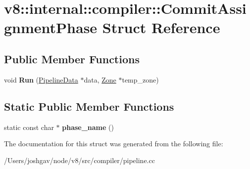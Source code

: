 \hypertarget{structv8_1_1internal_1_1compiler_1_1_commit_assignment_phase}{}\section{v8\+:\+:internal\+:\+:compiler\+:\+:Commit\+Assignment\+Phase Struct Reference}
\label{structv8_1_1internal_1_1compiler_1_1_commit_assignment_phase}
\subsection*{Public Member Functions}
\begin{DoxyCompactItemize}
\item 
void {\bfseries Run} (\hyperlink{classv8_1_1internal_1_1compiler_1_1_pipeline_data}{Pipeline\+Data} $\ast$data, \hyperlink{classv8_1_1internal_1_1_zone}{Zone} $\ast$temp\+\_\+zone)\hypertarget{structv8_1_1internal_1_1compiler_1_1_commit_assignment_phase_ab53dce69b74e2081c80b7a60c5bc6a43}{}\label{structv8_1_1internal_1_1compiler_1_1_commit_assignment_phase_ab53dce69b74e2081c80b7a60c5bc6a43}

\end{DoxyCompactItemize}
\subsection*{Static Public Member Functions}
\begin{DoxyCompactItemize}
\item 
static const char $\ast$ {\bfseries phase\+\_\+name} ()\hypertarget{structv8_1_1internal_1_1compiler_1_1_commit_assignment_phase_ad23bdb79c9f63ae11051db9cee0ad565}{}\label{structv8_1_1internal_1_1compiler_1_1_commit_assignment_phase_ad23bdb79c9f63ae11051db9cee0ad565}

\end{DoxyCompactItemize}


The documentation for this struct was generated from the following file\+:\begin{DoxyCompactItemize}
\item 
/\+Users/joshgav/node/v8/src/compiler/pipeline.\+cc\end{DoxyCompactItemize}
